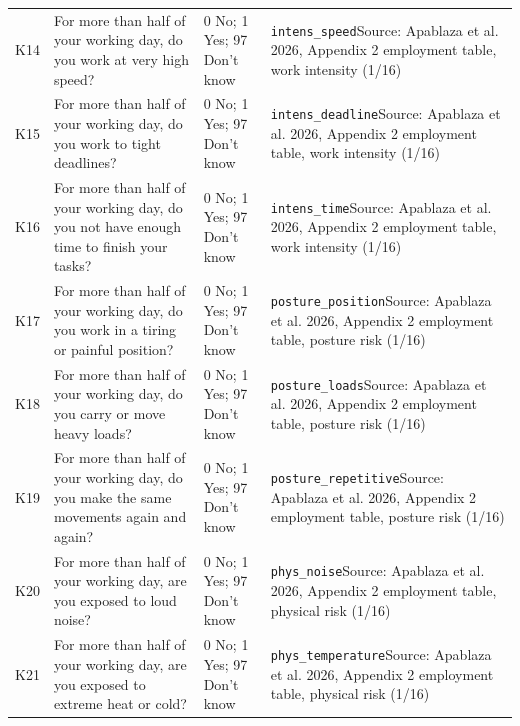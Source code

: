 \documentclass[10pt]{article}
\begin{document}
{\begin{longtable}{p{0.8cm}p{6.4cm}p{3.6cm}p{5.8cm}}
K14 & For more than half of your working day, do you work at very high speed? & 0 No; 1 Yes; 97 Don't know & \texttt{intens\_speed}\newline Source: Apablaza et al. 2026, Appendix 2 employment table, work intensity (1/16) \\
K15 & For more than half of your working day, do you work to tight deadlines? & 0 No; 1 Yes; 97 Don't know & \texttt{intens\_deadline}\newline Source: Apablaza et al. 2026, Appendix 2 employment table, work intensity (1/16) \\
K16 & For more than half of your working day, do you not have enough time to finish your tasks? & 0 No; 1 Yes; 97 Don't know & \texttt{intens\_time}\newline Source: Apablaza et al. 2026, Appendix 2 employment table, work intensity (1/16) \\
K17 & For more than half of your working day, do you work in a tiring or painful position? & 0 No; 1 Yes; 97 Don't know & \texttt{posture\_position}\newline Source: Apablaza et al. 2026, Appendix 2 employment table, posture risk (1/16) \\
K18 & For more than half of your working day, do you carry or move heavy loads? & 0 No; 1 Yes; 97 Don't know & \texttt{posture\_loads}\newline Source: Apablaza et al. 2026, Appendix 2 employment table, posture risk (1/16) \\
K19 & For more than half of your working day, do you make the same movements again and again? & 0 No; 1 Yes; 97 Don't know & \texttt{posture\_repetitive}\newline Source: Apablaza et al. 2026, Appendix 2 employment table, posture risk (1/16) \\
K20 & For more than half of your working day, are you exposed to loud noise? & 0 No; 1 Yes; 97 Don't know & \texttt{phys\_noise}\newline Source: Apablaza et al. 2026, Appendix 2 employment table, physical risk (1/16) \\
K21 & For more than half of your working day, are you exposed to extreme heat or cold? & 0 No; 1 Yes; 97 Don't know & \texttt{phys\_temperature}\newline Source: Apablaza et al. 2026, Appendix 2 employment table, physical risk (1/16) \\
\bottomrule
\end{longtable}
}
\end{document}
